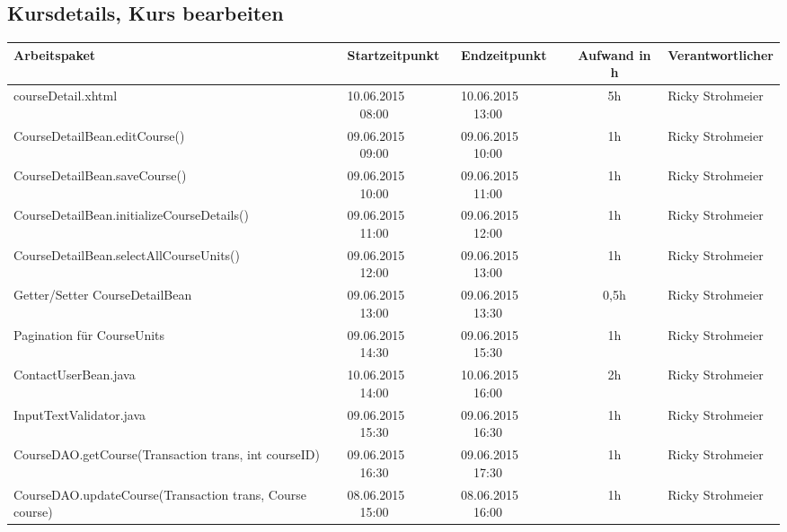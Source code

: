 \begin{landscape}
	\subsection{Kursdetails, Kurs bearbeiten}
	\begin{tabular}{|p{10.3cm}|p{3.2cm}|p{3.2cm}|c|p{3.5cm}|}
		\hline  \textbf{Arbeitspaket} & \textbf{Startzeitpunkt} & \textbf{Endzeitpunkt} & \textbf{Aufwand in h} & \textbf{Verantwortlicher} \\ 
		\hline   courseDetail.xhtml                                         & 10.06.2015 \ \ 08:00       & 10.06.2015  \ \  13:00      &  5h              & Ricky Strohmeier\\
		\hline   CourseDetailBean.editCourse()                              & 09.06.2015 \ \ 09:00       & 09.06.2015  \ \  10:00      &  1h              & Ricky Strohmeier\\
		\hline   CourseDetailBean.saveCourse()                              & 09.06.2015 \ \ 10:00       & 09.06.2015  \ \  11:00      &  1h              & Ricky Strohmeier\\
		\hline   CourseDetailBean.initializeCourseDetails()                 & 09.06.2015 \ \ 11:00       & 09.06.2015  \ \  12:00      &  1h              & Ricky Strohmeier\\
		\hline   CourseDetailBean.selectAllCourseUnits()                    & 09.06.2015 \ \ 12:00       & 09.06.2015  \ \  13:00      &  1h              & Ricky Strohmeier\\
		\hline   Getter/Setter CourseDetailBean                             & 09.06.2015 \ \ 13:00       & 09.06.2015  \ \  13:30      &  0,5h            & Ricky Strohmeier\\
		\hline   Pagination für CourseUnits                                 & 09.06.2015 \ \ 14:30       & 09.06.2015  \ \  15:30      &  1h              & Ricky Strohmeier\\
		\hline   ContactUserBean.java                                       & 10.06.2015 \ \ 14:00       & 10.06.2015  \ \  16:00      &  2h              & Ricky Strohmeier\\
		\hline   InputTextValidator.java                                    & 09.06.2015 \ \ 15:30       & 09.06.2015  \ \  16:30      &  1h              & Ricky Strohmeier\\
		\hline   CourseDAO.getCourse(Transaction trans, int courseID)       & 09.06.2015 \ \ 16:30       & 09.06.2015  \ \  17:30      &  1h              & Ricky Strohmeier\\
		\hline   CourseDAO.updateCourse(Transaction trans, Course course)   & 08.06.2015 \ \ 15:00       & 08.06.2015  \ \  16:00      &  1h              & Ricky Strohmeier\\

\end{tabular}
\end{landscape}
